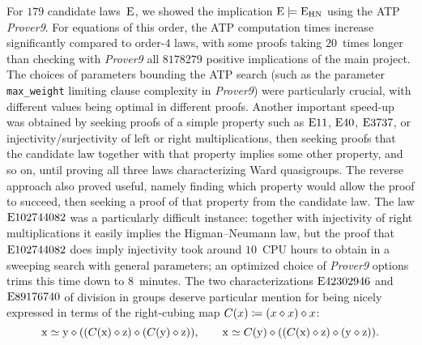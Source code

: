 For $179$ candidate laws~$\mathrm{E}$, we showed the implication $\mathrm{E}\models\mathrm{E}_{\mathrm{HN}}$ using the ATP \emph{Prover9}.  For equations of this order, the ATP computation times increase significantly compared to order-$4$ laws, with some proofs taking $20$~times longer than checking with \emph{Prover9} all $\num{8178279}$ positive implications of the main project.  The choices of parameters bounding the ATP search (such as the parameter \texttt{max\_weight} limiting clause complexity in \emph{Prover9}) were particularly crucial, with different values being optimal in different proofs.  Another important speed-up was obtained by seeking proofs of a simple property such as $\mathrm{E}11$, $\mathrm{E}40$, $\mathrm{E}3737$, or injectivity/surjectivity of left or right multiplications, then seeking proofs that the candidate law together with that property implies some other property, and so on, until proving all three laws characterizing Ward quasigroups.  The reverse approach also proved useful, namely finding which property would allow the proof to succeed, then seeking a proof of that property from the candidate law.  The law $\mathrm{E}102744082$ was a particularly difficult instance: together with injectivity of right multiplications it easily implies the Higman--Neumann law, but the proof that $\mathrm{E}102744082$ does imply injectivity took around $10$~CPU hours to obtain in a sweeping search with general parameters; an optimized choice of \emph{Prover9} options trims this time down to $8$~minutes.  The two characterizations $\mathrm{E}42302946$ and~$\mathrm{E}89176740$ of division in groups deserve particular mention for being nicely expressed in terms of the right-cubing map $C(x) \coloneqq (x \diamond x) \diamond x$:
\[
  \mathrm{x} \simeq \mathrm{y} \diamond ((C(\mathrm{x}) \diamond \mathrm{z}) \diamond (C(\mathrm{y}) \diamond \mathrm{z})) , \qquad
  \mathrm{x} \simeq C(\mathrm{y}) \diamond ((C(\mathrm{x}) \diamond \mathrm{z}) \diamond (\mathrm{y} \diamond \mathrm{z})) .
\]

